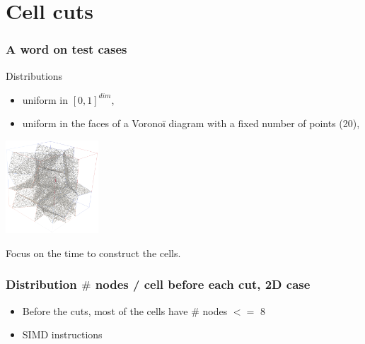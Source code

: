 \documentclass[aspectratio=169]{beamer}
\begin{document}
\section{Cell cuts}

\begin{frame}
    \frametitle{A word on test cases}

    Distributions
    \begin{itemize}
        \item uniform in $[0,1]^{dim}$,
        \item uniform in the faces of a Voronoï diagram with a fixed number of points (20),
    \end{itemize}

    \begin{center}
        
        \kern 1cm
        \includegraphics[width=0.26\textwidth]{img/voro_distrib_3d.png}
    \end{center}


    \vfill
    Focus on the time to construct the cells.
\end{frame}

\begin{frame}
    \frametitle{Distribution $\#$ nodes / cell before each cut, 2D case}

    \begin{minipage}[c][0.6\textheight][c]{0.4\textwidth}
            
    \end{minipage}
    \textwidth
    \begin{minipage}{0.55\textwidth}
        \begin{itemize}
            \item Before the cuts, most of the cells have $\#$ nodes $<=$ 8
            \item SIMD instructions
        \end{itemize}
    \end{minipage}
\end{frame}
\end{document}
